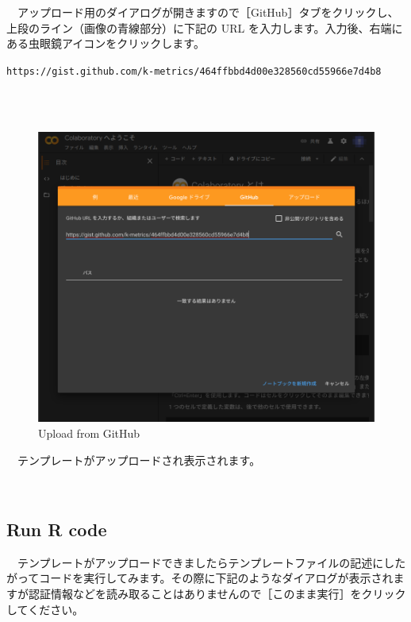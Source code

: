 \documentclass[
  12pt,
]{book}
\begin{document}
　アップロード用のダイアログが開きますので［GitHub］タブをクリックし、上段のライン（画像の青線部分）に下記の URL を入力します。入力後、右端にある虫眼鏡アイコンをクリックします。

\texttt{https://gist.github.com/k-metrics/464ffbbd4d00e328560cd55966e7d4b8}\strut \\
　

\begin{figure}[H]

{\centering \includegraphics[width=0.8\linewidth,]{fig/Colab/upload_dialog} 

}

\caption{Upload from GitHub}\label{fig:unnamed-chunk-137}
\end{figure}

　テンプレートがアップロードされ表示されます。

　

\hypertarget{run-r-code}{%
\subsection{Run R code}\label{run-r-code}}

　テンプレートがアップロードできましたらテンプレートファイルの記述にしたがってコードを実行してみます。その際に下記のようなダイアログが表示されますが認証情報などを読み取ることはありませんので［このまま実行］をクリックしてください。
\end{document}
